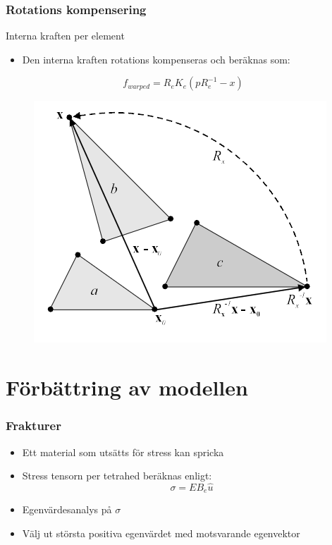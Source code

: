 \documentclass{beamer}
\begin{document}
\begin{frame}
\frametitle{Rotations kompensering}
\begin{block}{Interna kraften per element}
\begin{itemize}
\item Den interna kraften rotations kompenseras och beräknas som:
\end{itemize}
\begin{equation}\label{eqn:stiffnessmatrix}
    f_{warped} = R_{e}K_{e}(pR_{e}^{-1}-x)
\end{equation}
\begin{figure}
\includegraphics[scale=0.5]{warpedstiffness.png}
\end{figure}
\end{block}
\end{frame}

\section{Förbättring av modellen}
\begin{frame}
\frametitle{Frakturer}
\begin{itemize}
\item Ett material som utsätts för stress kan spricka

\item Stress tensorn per tetrahed beräknas enligt:
\begin{equation}\label{eqn:stiffnessmatrix}
    \sigma = EB_{e}\hat{u}
\end{equation}

\item Egenvärdesanalys på $\sigma$

\item Välj ut största positiva egenvärdet med motsvarande egenvektor

\end{itemize}
\end{frame}
\end{document}

